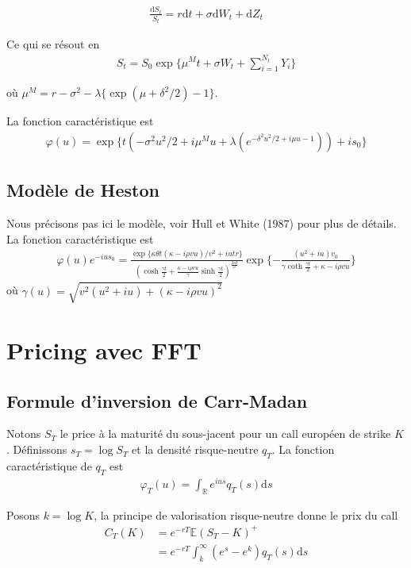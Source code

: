 \documentclass{article}
\begin{document}
\begin{align*}
	\frac{\mathrm{d}S_t}{S_t} = r\mathrm{d}t + \sigma\mathrm{d}W_t + \mathrm{d}Z_t
\end{align*}

Ce qui se résout en
\begin{align*}
	S_t = S_0 \exp\big\{\mu^M t +  \sigma W_t + \sum_{i=1}^{N_t} Y_i\big\}
\end{align*}

où $\mu^M = r - \sigma^2-\lambda\{\exp(\mu+\delta^2/2)-1\}$. 

La fonction caractéristique est
\begin{align*}
	\varphi(u) = \exp\{t(-\sigma^2u^2/2+i\mu^M u + \lambda(e^{-\delta^2u^2/2+i\mu u -1}))+is_0\}
\end{align*}

\subsection{Modèle de Heston}
Nous précisons pas ici le modèle, voir Hull et White (1987) pour plus de détails. La fonction caractéristique est
\begin{align*}
	\varphi(u)e^{-ius_0} = \frac{\exp\{\kappa \theta t(\kappa - i \rho v u)/v^2+iut r\}}{(\cosh\frac{\gamma t}{2}+\frac{\kappa-i\rho v u }{\gamma}\sinh\frac{\gamma t }{2})^{\frac{2\kappa \theta}{v^2}}}\exp\{-\frac{(u^2+iu)v_0}{\gamma \coth\frac{\gamma t}{2}+\kappa-i\rho v u}\}
\end{align*}
où $\gamma(u) = \sqrt{v^2(u^2+iu)+(\kappa-i\rho v u)^2}$

\section{Pricing avec FFT}
\subsection{Formule d'inversion de Carr-Madan}
Notons $S_T$ le price à la maturité du sous-jacent pour un call européen de strike $K$. Définissons $s_T = \log S_T$ et la densité risque-neutre $q_T$. La fonction caractéristique de $q_T$ est
\begin{align*}
	\varphi_T(u) = \int_{\mathbb{R}}e^{ius}q_T(s)\mathrm{d}s
\end{align*}

Posons $k = \log K$, la principe de valorisation risque-neutre donne le prix du call
\begin{align*}
	C_T(K) &= e^{-rT}\mathbb{E}(S_T-K)^+\\
	&= e^{-rT}\int_{k}^{\infty}(e^s-e^k)q_T(s)\mathrm{d}s
\end{align*}
\end{document}
